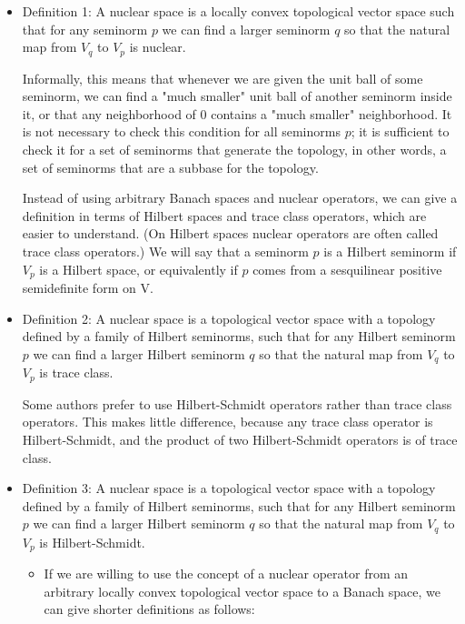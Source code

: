 \documentclass[aps,preprint]{revtex4}%
\begin{document}
\begin{itemize}
\item Definition 1: A nuclear space is a locally convex topological vector
space such that for any seminorm $p$ we can find a larger seminorm $q$ so that
the natural map from $V_{q}$ to $V_{p}$ is nuclear.

Informally, this means that whenever we are given the unit ball of some
seminorm, we can find a "much smaller" unit ball of another seminorm inside
it, or that any neighborhood of 0 contains a "much smaller" neighborhood. It
is not necessary to check this condition for all seminorms $p$; it is
sufficient to check it for a set of seminorms that generate the topology, in
other words, a set of seminorms that are a subbase for the topology.

\qquad Instead of using arbitrary Banach spaces and nuclear operators, we can
give a definition in terms of Hilbert spaces and trace class operators, which
are easier to understand. (On Hilbert spaces nuclear operators are often
called trace class operators.) We will say that a seminorm $p$ is a Hilbert
seminorm if $V_{p}$ is a Hilbert space, or equivalently if $p$ comes from a
sesquilinear positive semidefinite form on V.

\item Definition 2: A nuclear space is a topological vector space with a
topology defined by a family of Hilbert seminorms, such that for any Hilbert
seminorm $p$ we can find a larger Hilbert seminorm $q$ so that the natural map
from $V_{q}$ to $V_{p}$ is trace class.

Some authors prefer to use Hilbert-Schmidt operators rather than trace class
operators. This makes little difference, because any trace class operator is
Hilbert-Schmidt, and the product of two Hilbert-Schmidt operators is of trace class.

\item Definition 3: A nuclear space is a topological vector space with a
topology defined by a family of Hilbert seminorms, such that for any Hilbert
seminorm $p$ we can find a larger Hilbert seminorm $q$ so that the natural map
from $V_{q}$ to $V_{p}$ is Hilbert-Schmidt.

\begin{itemize}
\item If we are willing to use the concept of a nuclear operator from an
arbitrary locally convex topological vector space to a Banach space, we can
give shorter definitions as follows:
\end{itemize}


\end{itemize}
\end{document}
